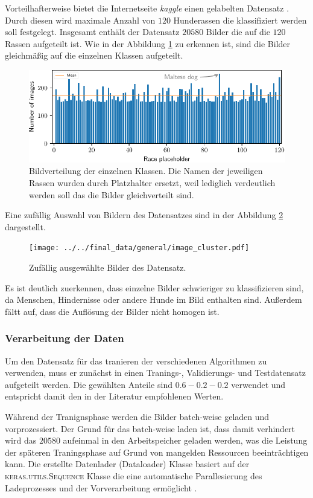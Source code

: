 Vorteilhafterweise bietet die Internetseite \emph{kaggle} einen gelabelten
Datensatz \cite{datensatz}. Durch diesen wird maximale Anzahl von $120$
Hunderassen die klassifiziert werden soll festgelegt. Insgesamt enthält der
Datensatz $20580$ Bilder die auf die $120$ Rassen aufgeteilt ist. Wie in der
Abbildung \ref{fig:gleichverteilung_bilder} zu erkennen ist, sind die Bilder
gleichmäßig auf die einzelnen Klassen aufgeteilt.
\begin{figure}
\centering
\includegraphics[width=\the\textwidth]{../../final_data/general/image_distribution.pdf}
\caption{Bildverteilung der einzelnen Klassen. Die Namen der jeweiligen Rassen
         wurden durch Platzhalter ersetzt, weil lediglich verdeutlich werden soll
         das die Bilder gleichverteilt sind.}
\label{fig:gleichverteilung_bilder}
\end{figure}
Eine zufällig Auswahl von Bildern des Datensatzes sind in der Abbildung \ref{fig:bilder_cluser}
dargestellt.
\begin{figure}
\centering
\texttt{[image: ../../final\_data/general/image\_cluster.pdf]}
\caption{Zufällig ausgewählte Bilder des Datensatz.}
\label{fig:bilder_cluser}
\end{figure}
Es ist deutlich zuerkennen, dass einzelne Bilder schwieriger zu klassifizieren sind,
da Menschen, Hindernisse oder andere Hunde im Bild enthalten sind. Außerdem
fältt auf, dass die Auflösung der Bilder nicht homogen ist.

\subsubsection{Verarbeitung der Daten}
Um den Datensatz für das tranieren der verschiedenen Algorithmen zu verwenden,
muss er zunächst in einen Tranings-, Validierungs- und Testdatensatz aufgeteilt
werden. Die gewählten Anteile sind $0.6-0.2-0.2$ verwendet und entspricht damit
den in der Literatur \cite[S. 29]{hands_on_machine_learning} empfohlenen Werten.

Während der Tranignsphase werden die Bilder batch-weise geladen und vorprozessiert.
Der Grund für das batch-weise laden ist, dass damit verhindert wird das $20580$
aufeinmal in den Arbeitspeicher geladen werden, was die Leistung der späteren
Traningsphase auf Grund von mangelden Ressourcen beeinträchtigen kann. Die erstellte
Datenlader (Dataloader) Klasse basiert auf der \textsc{keras.utils.Sequence} Klasse die eine
automatische Parallesierung des Ladeprozesses und der Vorverarbeitung ermöglicht
\cite{keras_sequentiel}.


